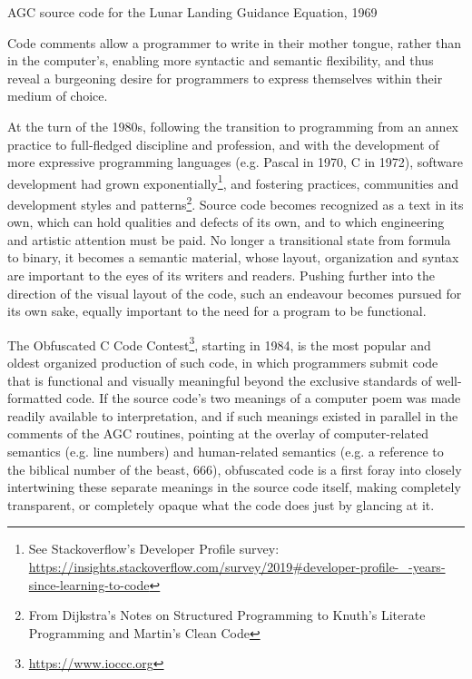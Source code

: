\begin{listing}
  \inputminted{ca65}{./corpus/numero_mysterioso.asm}
  \caption{AGC source code for the Lunar Landing Guidance Equation, 1969}
  \label{code:numero_mysterioso_asm}
\end{listing}

Code comments allow a programmer to write in their mother tongue, rather than in the computer's, enabling more syntactic and semantic flexibility, and thus reveal a burgeoning desire for programmers to express themselves within their medium of choice.

At the turn of the 1980s, following the transition to programming from an annex practice to full-fledged discipline and profession, and with the development of more expressive programming languages (e.g. Pascal in 1970, C in 1972), software development had grown exponentially\footnote{See Stackoverflow's Developer Profile survey: \url{https://insights.stackoverflow.com/survey/2019\#developer-profile-_-years-since-learning-to-code}}, and fostering practices, communities and development styles and patterns\footnote{From Dijkstra's Notes on Structured Programming to Knuth's Literate Programming and Martin's Clean Code}. Source code becomes recognized as a text in its own, which can hold qualities and defects of its own, and to which engineering and artistic attention must be paid. No longer a transitional state from formula to binary, it becomes a semantic material, whose layout, organization and syntax are important to the eyes of its writers and readers. Pushing further into the direction of the visual layout of the code, such an endeavour becomes pursued for its own sake, equally important to the need for a program to be functional.

The Obfuscated C Code Contest\footnote{\url{https://www.ioccc.org}}, starting in 1984, is the most popular and oldest organized production of such code, in which programmers submit code that is functional and visually meaningful beyond the exclusive standards of well-formatted code. If the source code's two meanings of a computer poem was made readily available to interpretation, and if such meanings existed in parallel in the comments of the AGC routines, pointing at the overlay of computer-related semantics (e.g. line numbers) and human-related semantics (e.g. a reference to the biblical number of the beast, 666), obfuscated code is a first foray into closely intertwining these separate meanings in the source code itself, making completely transparent, or completely opaque what the code does just by glancing at it.


